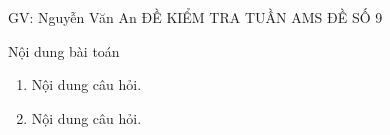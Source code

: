 \begin{name}
	{GV: Nguyễn Văn An}
	{ĐỀ KIỂM TRA TUẦN AMS  ĐỀ SỐ 9}
\end{name}
\setcounter{ex}{0}\setcounter{bt}{0}
\begin{bt}%
	Nội dung bài toán 
	\begin{enumerate}
		\item Nội dung câu hỏi.
		\item Nội dung câu hỏi.
	\end{enumerate}
\end{bt}
